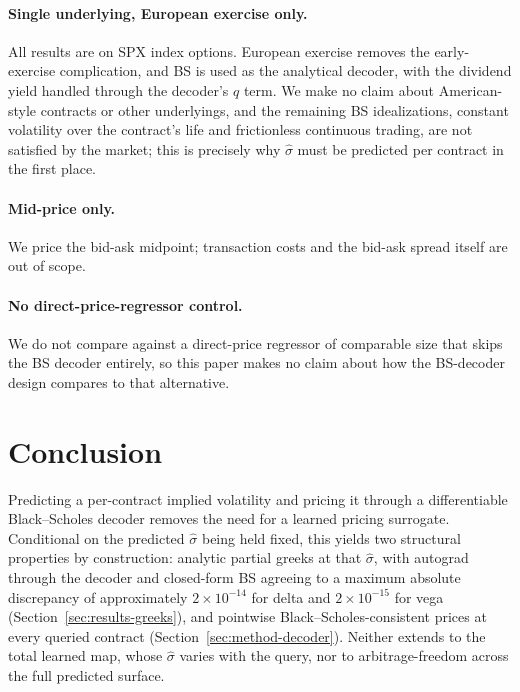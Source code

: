 \documentclass[11pt]{article}
\begin{document}
\paragraph{Single underlying, European exercise only.} All results are on SPX index options. European
exercise removes the early-exercise complication, and BS is used as the analytical decoder, with the
dividend yield handled through the decoder's $q$ term. We make no claim about American-style contracts
or other underlyings, and the remaining BS idealizations, constant volatility over the contract's life
and frictionless continuous trading, are not satisfied by the market; this is precisely why $\hat\sigma$
must be predicted per contract in the first place.

\paragraph{Mid-price only.} We price the bid-ask midpoint; transaction costs and the bid-ask spread
itself are out of scope.

\paragraph{No direct-price-regressor control.} We do not compare against a direct-price regressor of
comparable size that skips the BS decoder entirely, so this paper makes no claim about how the
BS-decoder design compares to that alternative.

\section{Conclusion}
\label{sec:conclusion}
Predicting a per-contract implied volatility and pricing it through a differentiable Black--Scholes
decoder removes the need for a learned pricing surrogate. Conditional on the predicted $\hat\sigma$
being held fixed, this yields two structural properties by construction: analytic partial greeks at
that $\hat\sigma$, with autograd through the decoder and closed-form BS agreeing to a maximum absolute
discrepancy of approximately $2\times10^{-14}$ for delta and $2\times10^{-15}$ for vega
(Section~\ref{sec:results-greeks}), and pointwise Black--Scholes-consistent
prices at every queried contract (Section~\ref{sec:method-decoder}). Neither extends to the total
learned map, whose $\hat\sigma$ varies with the query, nor to arbitrage-freedom across the full
predicted surface.
\end{document}
